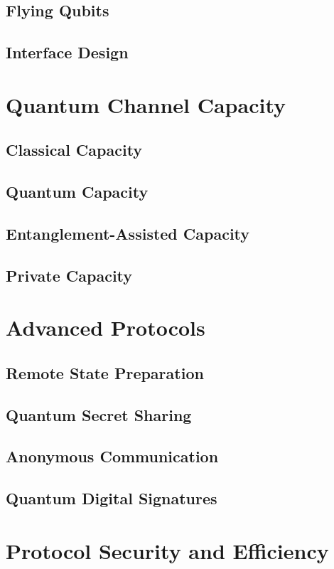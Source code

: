 \documentclass[12pt,a4paper]{book}
\begin{document}
\subsection{Flying Qubits}
\subsection{Interface Design}

\section{Quantum Channel Capacity}
\subsection{Classical Capacity}
\subsection{Quantum Capacity}
\subsection{Entanglement-Assisted Capacity}
\subsection{Private Capacity}

\section{Advanced Protocols}
\subsection{Remote State Preparation}
\subsection{Quantum Secret Sharing}
\subsection{Anonymous Communication}
\subsection{Quantum Digital Signatures}

\section{Protocol Security and Efficiency}
\end{document}
